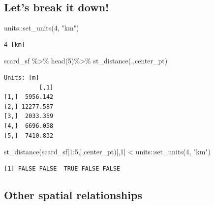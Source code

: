 \documentclass[
  a4paper,
  DIV=11,
  numbers=noendperiod]{scrartcl}
\newenvironment{Shaded}{\begin{snugshade}}{\end{snugshade}}
\newcommand{\DecValTok}[1]{\textcolor[rgb]{0.68,0.00,0.00}{#1}}
\newcommand{\FunctionTok}[1]{\textcolor[rgb]{0.28,0.35,0.67}{#1}}
\newcommand{\NormalTok}[1]{\textcolor[rgb]{0.00,0.23,0.31}{#1}}
\newcommand{\SpecialCharTok}[1]{\textcolor[rgb]{0.37,0.37,0.37}{#1}}
\newcommand{\StringTok}[1]{\textcolor[rgb]{0.13,0.47,0.30}{#1}}
\begin{document}
\hypertarget{lets-break-it-down}{%
\subsection{Let's break it down!}\label{lets-break-it-down}}

\begin{Shaded}
\begin{Highlighting}[]
\NormalTok{units}\SpecialCharTok{::}\FunctionTok{set\_units}\NormalTok{(}\DecValTok{4}\NormalTok{, }\StringTok{"km"}\NormalTok{)}
\end{Highlighting}
\end{Shaded}

\begin{verbatim}
4 [km]
\end{verbatim}

\begin{Shaded}
\begin{Highlighting}[]
\NormalTok{scard\_sf }\SpecialCharTok{\%\textgreater{}\%}
    \FunctionTok{head}\NormalTok{(}\DecValTok{5}\NormalTok{)}\SpecialCharTok{\%\textgreater{}\%}
    \FunctionTok{st\_distance}\NormalTok{(.,center\_pt)}
\end{Highlighting}
\end{Shaded}

\begin{verbatim}
Units: [m]
          [,1]
[1,]  5956.142
[2,] 12277.587
[3,]  2033.359
[4,]  6696.058
[5,]  7410.832
\end{verbatim}

\begin{Shaded}
\begin{Highlighting}[]
\FunctionTok{st\_distance}\NormalTok{(scard\_sf[}\DecValTok{1}\SpecialCharTok{:}\DecValTok{5}\NormalTok{,],center\_pt)[,}\DecValTok{1}\NormalTok{] }\SpecialCharTok{\textless{}}\NormalTok{ units}\SpecialCharTok{::}\FunctionTok{set\_units}\NormalTok{(}\DecValTok{4}\NormalTok{, }\StringTok{"km"}\NormalTok{)}
\end{Highlighting}
\end{Shaded}

\begin{verbatim}
[1] FALSE FALSE  TRUE FALSE FALSE
\end{verbatim}

\hypertarget{other-spatial-relationships}{%
\subsection{Other spatial
relationships}\label{other-spatial-relationships}}
\end{document}
